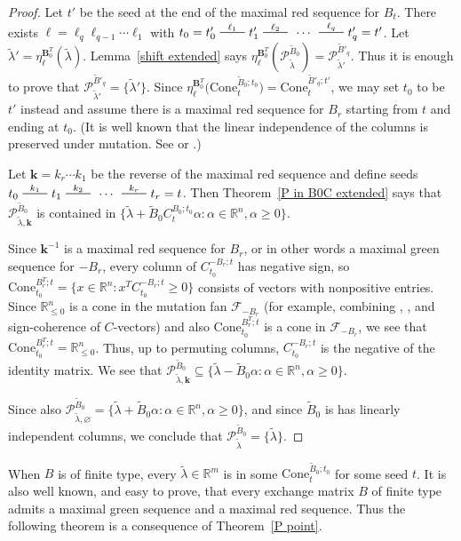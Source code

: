 \documentclass{amsart}
\theoremstyle{definition}
\theoremstyle{remark}
\numberwithin{equation}{section}
\newcommand{\reals}{\mathbb R}
\newcommand{\edge}{\,\,\rule[2.7pt]{20pt}{0.5pt}\,\,}
\newcommand{\set}[1]{{\lbrace #1 \rbrace}}
\newcommand{\F}{{\mathcal F}}
\newcommand{\0}{{\mathbf{0}}}
\newcommand{\Cone}{\mathrm{Cone}}
\newcommand{\kk}{{\boldsymbol{k}}}
\renewcommand{\ll}{{\boldsymbol\ell}}
\newcommand{\tB}{{\widetilde{B}}}
\newcommand{\BB}{\mathbf{B}}
\renewcommand{\P}{\mathcal{P}}
\begin{document}
\begin{proof}%
Let $t'$ be the seed at the end of the maximal red sequence for $B_t$.
There exists $\ll=\ell_q\ell_{q-1}\cdots\ell_1$ with $t_0=t'_0\overset{\ell_1}{\edge}t'_1\overset{\ell_2}{\edge}\,\cdots\,\overset{\ell_q}{\edge}t'_q=t'$.
Let $\tilde\lambda'=\eta^{\BB_0^T}_\ll\!(\tilde\lambda)$.
  Lemma~\ref{shift extended} says $\eta^{\BB_0^T}_\ll\!(\P^{\tB_0}_{\tilde\lambda})=\P^{\tB'_q}_{\tilde\lambda'}$.
Thus it is enough to prove that $\P^{\tB'_q}_{\tilde\lambda'}=\set{\tilde\lambda'}$.
Since $\eta_\ll^{\BB_0^T}\bigl(\Cone_t^{\tB_0;t_0}\bigr)=\Cone_t^{\tB'_q;t'}$, we may set $t_0$ to be $t'$ instead and assume there is a maximal red sequence for $B_r$ starting from $t$ and ending at $t_0$.
(It is well known that the linear independence of the columns is preserved under mutation.
See \cite[Lemma~1.2]{GSV03} or \cite[Lemma~3.2]{ca3}.)

Let $\kk=k_r\cdots k_1$ be the reverse of the maximal red sequence and define seeds $t_0\overset{k_1}{\edge}t_1\overset{k_2}{\edge}\,\cdots\,\overset{k_r}{\edge}t_r=t$.
Then Theorem~\ref{P in B0C extended} says that $\P^{\tB_0}_{\tilde\lambda,\kk}$ is contained in $\set{\tilde\lambda+\tB_0C_t^{B_0;t_0}\alpha:\alpha\in\reals^n,\alpha\ge0}$.

Since $\kk^{-1}$ is a maximal red sequence for $B_r$, or in other words a maximal green sequence for $-B_r$, every column of $C_{t_0}^{-B_r;t}$ has negative sign, so $\Cone_{t_0}^{B_r^T;t}=\set{x\in\reals^n:x^TC_{t_0}^{-B_r;t}\ge0}$ consists of vectors with nonpositive entries.
Since $\reals_{\le0}^n$ is a cone in the mutation fan $\F_{-B_r}$ (for example, combining \mbox{\cite[Proposition~7.1]{universal}}, \mbox{\cite[Proposition~8.9]{universal}}, and sign-coherence of $C$-vectors) and also $\Cone_{t_0}^{B_r^T;t}$ is a cone in $\F_{-B_r}$, we see that $\Cone_{t_0}^{B_r^T;t}=\reals_{\le0}^n$.
Thus, up to permuting columns, $C_{t_0}^{-B_r;t}$ is the negative of the identity matrix.
We see that $\P^{\tB_0}_{\tilde\lambda,\kk}\subseteq\set{\tilde\lambda-\tB_0\alpha:\alpha\in\reals^n,\alpha\ge0}$.

  Since also $\P^{\tB_0}_{\tilde\lambda,\varnothing}=\set{\tilde\lambda+\tB_0\alpha:\alpha\in\reals^n,\alpha\ge0}$, and since $\tB_0$ is has linearly independent columns, we conclude that $\P^{\tB_0}_{\tilde\lambda}=\set{\tilde\lambda}$.
\end{proof}

When $B$ is of finite type, every $\tilde\lambda\in\reals^m$ is in some $\Cone^{\tB_0;t_0}_t$ for some seed $t$.
It is also well known, and easy to prove, that every exchange matrix $B$ of finite type admits a maximal green sequence and a maximal red sequence.
Thus the following theorem is a consequence of Theorem~\ref{P point}.
\end{document}
